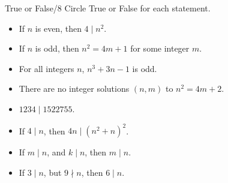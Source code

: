 \documentclass[12pt,letterpaper]{article}
\begin{document}
\begin{problem}{True or False\hfill/8}
  Circle True or False for each statement.

  \begin{itemize}
    \item If \(n\) is even, then \(4 \mid n^2\). \hfill \TFTrue
    \item If \(n\) is odd, then \(n^2 = 4m + 1\) for some integer \(m\).
    \hfill \TFTrue
    \item For all integers \(n\), \(n^3 + 3n - 1\) is odd. \hfill \TFTrue
    \item There are no integer solutions \((n, m)\) to \(n^2 = 4m + 2\).
    \hfill \TFTrue
    \item \(1234 \mid 1522755\). \hfill \TFFalse
    \item If \(4 \mid n\), then \(4n \mid (n^2+n)^2\). \hfill \TFTrue
    \item If \(m \mid n\), and \(k \mid n\), then \(m \mid n\). \hfill \TFFalse
    \item If \(3 \mid n\), but \(9 \nmid n\), then \(6 \mid n\). \hfill
    \TFFalse
  \end{itemize}
\end{problem}
\end{document}
